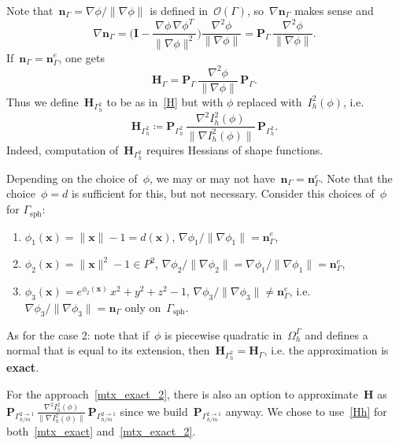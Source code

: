 \documentclass[12pt]{article}
\newcommand{\vect}[1]{\boldsymbol{\mathbf{#1}}}
\newcommand{\sphere}{{\Gamma_{\text{sph}}}}
\begin{document}
Note that~$\vect n_\Gamma = \nabla \phi / \|\nabla \phi\|$ is defined in~$\mathcal{O}(\Gamma)$, so~$\nabla \vect n_\Gamma$ makes sense and
\begin{equation*}
	\nabla \vect n_\Gamma = \Big(\vect I - \frac{\nabla \phi\,\nabla \phi^T}{\|\nabla \phi\|^2}\Big)\frac{\nabla^2 \phi}{\|\nabla \phi\|} = \vect P_{\Gamma}\,\frac{\nabla^2 \phi}{\|\nabla \phi\|}.
\end{equation*}
If~$\vect n_\Gamma = \vect n^e_\Gamma$, one gets
\begin{equation}\label{H}
	\vect H_\Gamma = \vect P_{\Gamma}\,\frac{\nabla^2 \phi}{\|\nabla \phi\|}\,\vect P_{\Gamma}.
\end{equation}
Thus we define~$\vect H_{\Gamma^2_h}$ to be as in~\eqref{H} but with $\phi$ replaced with~$I^2_h(\phi)$, i.e.
\begin{equation}\label{Hh}
	\vect H_{\Gamma_h^2} \coloneqq \vect P_{\Gamma_h^2}\,\frac{\nabla^2 I_h^2(\phi)}{\|\nabla I_h^2(\phi)\|}\,\vect P_{\Gamma_h^2}.
\end{equation}
Indeed, computation of~$\vect H_{\Gamma^2_h}$ requires Hessians of shape functions.

Depending on the choice of~$\phi$, we may or may not have~$\vect n_\Gamma = \vect n^e_\Gamma$. Note that the choice~$\phi = d$ is sufficient for this, but not necessary. Consider this choices of~$\phi$ for $\sphere$:
\begin{enumerate}
	\item $\phi_1(\vect x) = \|\vect x\| - 1 = d(\vect x)$, $\nabla \phi_1 / \|\nabla \phi_1\| = \vect n_\Gamma^e$,
	\item $\phi_2(\vect x) = \|\vect x\|^2 - 1 \in P^2$, $\nabla \phi_2 / \|\nabla \phi_2\| = \nabla \phi_1 / \|\nabla \phi_1\| = \vect n_\Gamma^e$,
	\item $\phi_3(\vect x) = e^{\phi_2(\vect x)}\,x^2 + y^2 + z^2 -1$, $\nabla \phi_3 / \|\nabla \phi_3\| \ne \vect n_\Gamma^e$, i.e. $\nabla \phi_3 / \|\nabla \phi_3\| = \vect n_\Gamma$ only on~$\sphere$.
\end{enumerate}
As for the case 2: note that if~$\phi$ is piecewise quadratic in~$\Omega^\Gamma_h$ and defines a normal that is equal to its extension, then~$\vect H_{\Gamma^2_h} = \vect H_{\Gamma}$, i.e. the approximation is \textbf{exact}.

For the approach~\eqref{mtx_exact_2}, there is also an option to approximate~$\vect H$ as~$\vect P_{\Gamma_{h/m}^{2\to 1}}\,\frac{\nabla^2 I_h^2(\phi)}{\|\nabla I_h^2(\phi)\|}\,\vect P_{\Gamma_{h/m}^{2\to 1}}$ since we build~$\vect P_{\Gamma_{h/m}^{2\to 1}}$ anyway. We chose to use~\eqref{Hh} for both~\eqref{mtx_exact} and~\eqref{mtx_exact_2}.
\end{document}
